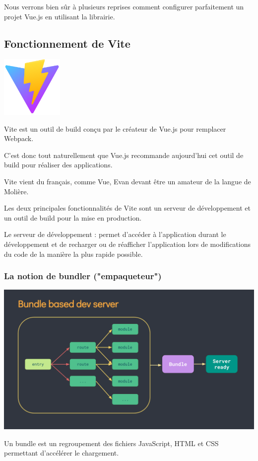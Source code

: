 \documentclass{article}
\begin{document}
Nous verrons bien sûr à plusieurs reprises comment configurer parfaitement un projet Vue.js en utilisant la librairie.

\subsection{Fonctionnement de Vite}
\begin{center}
\includegraphics[width=3cm]{images/image01.png}
\end{center}

Vite est un outil de build conçu par le créateur de Vue.js pour remplacer Webpack.

C'est donc tout naturellement que Vue.js recommande aujourd'hui cet outil de build pour réaliser des applications.

Vite vient du français, comme Vue, Evan devant être un amateur de la langue de Molière.

Les deux principales fonctionnalités de Vite sont un serveur de développement et un outil de build pour la mise en production.

Le serveur de développement : permet d'accéder à l'application durant le développement et de recharger ou de réafficher l'application lors de modifications du code de la manière la plus rapide possible.

\subsubsection{La notion de bundler ("empaqueteur")}
\begin{center}
\includegraphics[width=15cm]{images/image02.png}
\end{center}
Un bundle est un regroupement des fichiers JavaScript, HTML et CSS permettant d'accélérer le chargement.
\end{document}
